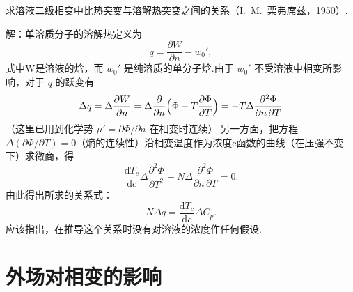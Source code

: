 \begin{xiti}

求溶液二级相变中比热突变与溶解热突变之间的关系（I.~M.~栗弗席兹，1950）.

解：单溶质分子的溶解热定义为
\begin{equation*}
  q=\frac{\partial W}{\partial n}-w_0',
\end{equation*}
式中W是溶液的焓，而 $w_0'$ 是纯溶质的单分子焓.由于 $w_0'$ 不受溶液中相变所影响，对于 $q$ 的跃变有
\begin{equation*}
  \Delta q=\Delta\frac{\partial W}{\partial n}
  =\Delta\frac{\partial}{\partial n}\Bigl(\Phi-T\frac{\partial\Phi}{\partial T}\Bigr)
  =-T\Delta\frac{\partial^2\Phi}{\partial n\,\partial T}
\end{equation*}
（这里已用到化学势 $\mu'=\partial\Phi/\partial n$ 在相变时连续）.另一方面，把方程 $\Delta(\partial\Phi/\partial T)=0$（熵的连续性）沿相变温度作为浓度c函数的曲线（在压强不变下）求微商，得
\begin{equation*}
  \frac{\mathrm{d}T_c}{\mathrm{d}c}\Delta\frac{\partial^2\Phi}{\partial T^2}
  +N\Delta\frac{\partial^2\Phi}{\partial n\,\partial T}=0.
\end{equation*}
由此得出所求的关系式：
\begin{equation*}
  N\Delta q=\frac{\mathrm{d}T_c}{\mathrm{d}c}\Delta C_p.
\end{equation*}
应该指出，在推导这个关系时没有对溶液的浓度作任何假设.

\end{xiti}

\section{外场对相变的影响}


